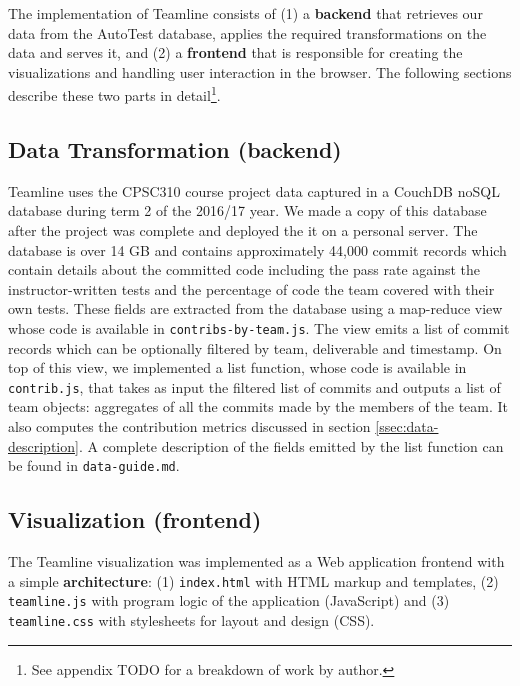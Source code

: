 \documentclass[../manifest.tex]{subfiles}
\begin{document}
The implementation of Teamline consists of (1) a \textbf{backend} that retrieves our data from the AutoTest database, applies the required transformations on the data and serves it, and (2) a \textbf{frontend} that is responsible for creating the visualizations and handling user interaction in the browser. The following sections describe these two parts in detail\footnote{See appendix TODO for a breakdown of work by author.}.

\subsection{Data Transformation (backend)}
Teamline uses the CPSC310 course project data captured in a CouchDB noSQL database during term 2 of the 2016/17 year. We made a copy of this database after the project was complete and deployed the it on a personal server. The database is over 14 GB and contains approximately 44,000 commit records which contain details about the committed code including the pass rate against the instructor-written tests and the percentage of code the team covered with their own tests. These fields are extracted from the database using a map-reduce view whose code is available in \texttt{contribs-by-team.js}. The view emits a list of commit records which can be optionally filtered by team, deliverable and timestamp. On top of this view, we implemented a list function, whose code is available in \texttt{contrib.js}, that takes as input the filtered list of commits and outputs a list of team objects: aggregates of all the commits made by the members of the team. It also computes the contribution metrics discussed in section \ref{ssec:data-description}. A complete description of the fields emitted by the list function can be found in \texttt{data-guide.md}.

\subsection{Visualization (frontend)}
The Teamline visualization was implemented as a Web application frontend with a simple \textbf{architecture}: (1) \texttt{index.html} with HTML markup and templates, (2) \texttt{teamline.js} with program logic of the application (JavaScript) and (3) \texttt{teamline.css} with stylesheets for layout and design (CSS).
\end{document}

